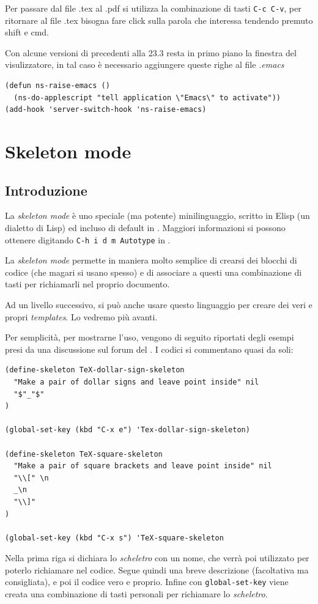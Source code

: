 \documentclass[10pt,a4paper]{article}
\begin{document}
Per passare dal file .tex al .pdf si utilizza la combinazione di tasti
\verb!C-c C-v!, per ritornare al file .tex bisogna fare click sulla
parola che interessa tendendo premuto shift e cmd.

Con alcune versioni di \emacs{} precedenti alla 23.3 resta in primo
piano la finestra del visulizzatore, in tal caso è necessario
aggiungere queste righe al file \emph{.emacs}
\begin{verbatim}
(defun ns-raise-emacs ()
  (ns-do-applescript "tell application \"Emacs\" to activate"))
(add-hook 'server-switch-hook 'ns-raise-emacs)
\end{verbatim}

\section{Skeleton mode}
\label{sec:skelmode}

\subsection*{Introduzione}
\label{skelintro}

La \emph{skeleton mode} è uno speciale (ma potente) minilinguaggio,
scritto in Elisp (un dialetto di Lisp) ed incluso di default in
\emacs. Maggiori informazioni si possono ottenere digitando 
\verb!C-h i d m Autotype! in \emacs.

La \emph{skeleton mode} permette in maniera molto semplice di crearsi
dei blocchi di codice (che magari si usano spesso) e di associare a
questi una combinazione di tasti per richiamarli nel proprio
documento.

Ad un livello successivo, si può anche usare questo linguaggio per
creare dei veri e propri \emph{templates}. Lo vedremo più avanti.

Per semplicità, per mostrarne l'uso, vengono di seguito riportati
degli esempi presi da una discussione sul forum del \guit. I codici si
commentano quasi da soli:
\begin{Verbatim}
(define-skeleton TeX-dollar-sign-skeleton
  "Make a pair of dollar signs and leave point inside" nil
  "$"_"$"
)

(global-set-key (kbd "C-x e") 'Tex-dollar-sign-skeleton) 

(define-skeleton TeX-square-skeleton
  "Make a pair of square brackets and leave point inside" nil
  "\\[" \n
  _\n
  "\\]"
)

(global-set-key (kbd "C-x s") 'TeX-square-skeleton
\end{Verbatim}
Nella prima riga si dichiara lo \emph{scheletro} con un nome, che
verrà poi utilizzato per poterlo richiamare nel codice. Segue quindi
una breve descrizione (facoltativa ma consigliata), e poi il codice
vero e proprio. Infine con \verb!global-set-key! viene creata una
combinazione di tasti personali per richiamare lo \emph{scheletro}.
\end{document}
